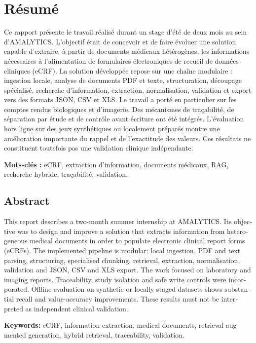 \chapter*{Résumé}
Ce rapport présente le travail réalisé durant un stage d'été de deux mois au sein d'AMALYTICS. L'objectif était de concevoir et de faire évoluer une solution capable d'extraire, à partir de documents médicaux hétérogènes, les informations nécessaires à l'alimentation de formulaires électroniques de recueil de données cliniques (eCRF). La solution développée repose sur une chaîne modulaire : ingestion locale, analyse de documents PDF et texte, structuration, découpage spécialisé, recherche d'information, extraction, normalisation, validation et export vers des formats JSON, CSV et XLS. Le travail a porté en particulier sur les comptes rendus biologiques et d'imagerie. Des mécanismes de traçabilité, de séparation par étude et de contrôle avant écriture ont été intégrés. L'évaluation hors ligne sur des jeux synthétiques ou localement préparés montre une amélioration importante du rappel et de l'exactitude des valeurs. Ces résultats ne constituent toutefois pas une validation clinique indépendante.\par
\textbf{Mots-clés :} eCRF, extraction d'information, documents médicaux, RAG, recherche hybride, traçabilité, validation.

\begin{otherlanguage}{english}
\chapter*{Abstract}
This report describes a two-month summer internship at AMALYTICS. Its objective was to design and improve a solution that extracts information from heterogeneous medical documents in order to populate electronic clinical report forms (eCRFs). The implemented pipeline is modular: local ingestion, PDF and text parsing, structuring, specialised chunking, retrieval, extraction, normalisation, validation and JSON, CSV and XLS export. The work focused on laboratory and imaging reports. Traceability, study isolation and safe write controls were incorporated. Offline evaluation on synthetic or locally staged datasets shows substantial recall and value-accuracy improvements. These results must not be interpreted as independent clinical validation.\par
\textbf{Keywords:} eCRF, information extraction, medical documents, retrieval augmented generation, hybrid retrieval, traceability, validation.
\end{otherlanguage}
